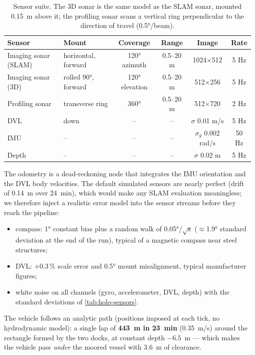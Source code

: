 \begin{table}[H]
\centering
\small
\begin{tabular}{llcccc}
\hline
Sensor & Mount & Coverage & Range & Image & Rate \\
\hline
Imaging sonar (SLAM) & horizontal, forward & 120° azimuth & 0.5--20 m & 1024$\times$512 & 5 Hz \\
Imaging sonar (3D)   & rolled 90°, forward & 120° elevation & 0.5--20 m & 512$\times$256 & 5 Hz \\
Profiling sonar      & transverse ring     & 360°           & 0.5--20 m & 512$\times$720 & 2 Hz \\
DVL                  & down                & --             & --        & $\sigma$ 0.01 m/s & 5 Hz \\
IMU                  & --                  & --             & --        & $\sigma_g$ 0.002 rad/s & 50 Hz \\
Depth                & --                  & --             & --        & $\sigma$ 0.02 m & 5 Hz \\
\hline
\end{tabular}
\caption{Sensor suite. The 3D sonar is the same model as the SLAM sonar,
mounted 0.15~m above it; the profiling sonar scans a vertical ring
perpendicular to the direction of travel (0.5°/beam).}
\label{tab:holo-sensors}
\end{table}

The odometry is a dead-reckoning node that integrates the IMU orientation and
the DVL body velocities. The default simulated sensors are nearly perfect
(drift of 0.14~m over 24~min), which would make any SLAM evaluation
meaningless; we therefore inject a realistic error model into the sensor
streams before they reach the pipeline:
\begin{itemize}
\item compass: 1° constant bias plus a random walk of 0.05°/$\sqrt{\text{s}}$
  ($\approx$1.9° standard deviation at the end of the run), typical of a
  magnetic compass near steel structures;
\item DVL: $+0.3\,\%$ scale error and 0.5° mount misalignment, typical
  manufacturer figures;
\item white noise on all channels (gyro, accelerometer, DVL, depth) with the
  standard deviations of \autoref{tab:holo-sensors}.
\end{itemize}
The vehicle follows an analytic path (positions imposed at each tick, no
hydrodynamic model): a single lap of \textbf{443~m in 23~min} (0.35~m/s) around
the rectangle formed by the two docks, at constant depth $-6.5$~m — which makes
the vehicle pass \emph{under} the moored vessel with 3.6~m of clearance.

